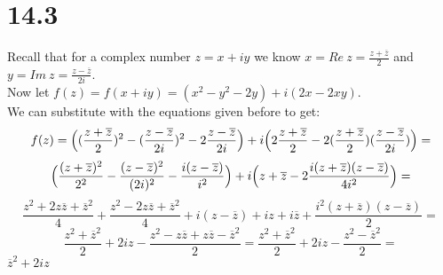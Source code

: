 \documentclass{article}
\begin{document}
\newpage
\section*{14.3}
\begin{center}
    \doublespacing
    Recall that for a complex number $z = x + iy$ we know $x = Re\:z =\frac{z +\overline{z}}{2}$ and $y = Im\:z =\frac{z -\overline{z}}{2i}$.
    \break
    \\Now let $f(z) = f(x + iy) = (x^2 - y^2 - 2y) + i(2x - 2xy)$.
    \\We can substitute with the equations given before to get:
    \[f(z) = \Big{(}(\frac{z +\overline{z}}{2})^2 - (\frac{z -\overline{z}}{2i})^2 - 2\frac{z -\overline{z}}{2i}\Big{)} + i\Big{(}2\frac{z +\overline{z}}{2} - 2 (\frac{z +\overline{z}}{2})(\frac{z -\overline{z}}{2i})\Big{)} =\]
    \[\Big{(}\frac{(z +\overline{z})^2}{2^2} -\frac{(z -\overline{z})^2}{(2i)^2} -\frac{i(z -\overline{z})}{i^2}\Big{)} + i\Big{(}z +\overline{z} - 2 \frac{i(z +\overline{z})(z -\overline{z})}{4i^2}\Big{)} =\]
    \[\frac{z^2 + 2z\overline{z} +\overline{z}^2}{4} +\frac{z^2 - 2z\overline{z} +\overline{z}^2}{4} + i(z -\overline{z}) + iz + i\overline{z} + \frac{i^2(z +\overline{z})(z -\overline{z})}{2} =\]
    \[\frac{z^2 +\overline{z}^2}{2} + 2iz -\frac{z^2 - z\overline{z} + z\overline{z} -\overline{z}^2}{2} =\frac{z^2 +\overline{z}^2}{2} + 2iz - \frac{z^2 -\overline{z}^2}{2} =\]
    $\overline{z}^2 + 2iz$ \qedsymbol
\end{center}


\newpage
\end{document}
